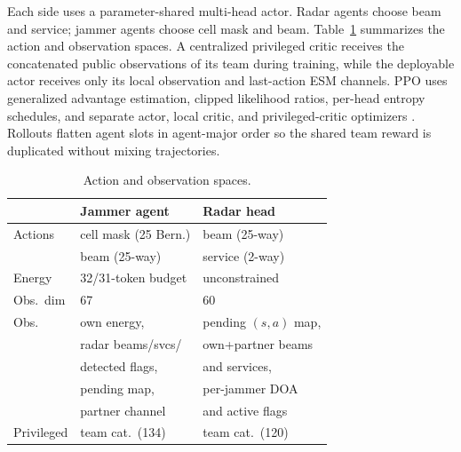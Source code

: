 Each side uses a parameter-shared multi-head actor. Radar agents choose beam and service; jammer agents choose cell mask and beam. Table~\ref{tab:spaces} summarizes the action and observation spaces. A centralized privileged critic receives the concatenated public observations of its team during training, while the deployable actor receives only its local observation and last-action ESM channels. PPO uses generalized advantage estimation, clipped likelihood ratios, per-head entropy schedules, and separate actor, local critic, and privileged-critic optimizers \cite{yu2022surprising,schulman2017proximal}. Rollouts flatten agent slots in agent-major order so the shared team reward is duplicated without mixing trajectories.

\begin{table}[t]
\caption{Action and observation spaces.}
\label{tab:spaces}
\centering
\footnotesize
\begin{tabular}{lll}
\toprule
 & Jammer agent & Radar head \\
\midrule
Actions & cell mask (25 Bern.) & beam (25-way) \\
 & beam (25-way) & service (2-way) \\
Energy & 32/31-token budget & unconstrained \\
Obs.\ dim & 67 & 60 \\
Obs. & own energy, & pending $(s,a)$ map, \\
 & radar beams/svcs/ & own+partner beams \\
 & detected flags, & and services, \\
 & pending map, & per-jammer DOA \\
 & partner channel & and active flags \\
Privileged & team cat.\ (134) & team cat.\ (120) \\
\bottomrule
\end{tabular}
\end{table}

